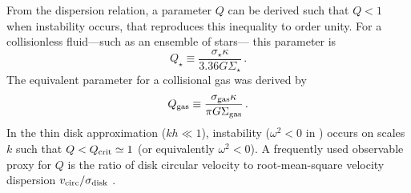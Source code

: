 \IfFileExists{emulateapjlegacy.cls}{\documentclass[iop]{emulateapjlegacy}}{\documentclass[iop]{emulateapj}}
\newcommand{\AF}[1]{({\bf \color{afcolor} AF: #1})}
\newcommand{\MM}[1]{({\bf \color{mmcolor} MM: #1})}
\begin{document}
From the dispersion relation, a parameter $Q$ can be derived such that $Q < 1$ when instability occurs, that reproduces this inequality to order unity.
For a collisionless fluid---such as an ensemble of stars--- this parameter is \citep{Toomre64a}
\begin{equation}
Q_{\star} \equiv\frac{\sigma_{\star}\kappa}{3.36 G \Sigma_{\star}}\,.
\end{equation}
The equivalent parameter for a collisional gas was derived by
    \citep{Goldreich65a}
\begin{equation}
Q_{\rm gas}\equiv\frac{\sigma_{\rm gas}\kappa}{\pi G \Sigma_{\rm gas}}\,.
\label{eqn:Q}
\end{equation}
In the thin disk approximation ($kh\ll1$), instability ($\omega^2 < 0$ in  ) occurs on scales $k$ such that $Q < Q_{\rm crit}\simeq1$ (or equivalently $\omega^2 < 0$). 
     A frequently used observable proxy for $Q$ is the ratio of disk circular velocity to root-mean-square velocity dispersion
$v_{\rm circ}/\sigma_{\rm disk}$
\citep[e.g.,][]{GarciaBurillo03a, Genzel11a, Kassin12a, Leung19a}.
%
\end{document}
